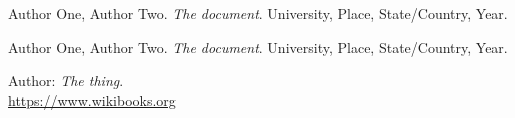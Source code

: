 \documentclass{article}				%
\begin{document}
\newpage

\begin{thebibliography}{3} %
	
	Author One, Author Two.
	\textit{The document}. 
	University, Place, State/Country, Year.
	
	Author One, Author Two.
	\textit{The document}. 
	University, Place, State/Country, Year.
	
	Author: \textit{The thing}. 
	\\\url{https://www.wikibooks.org}
	
\end{thebibliography}

\end{document}
